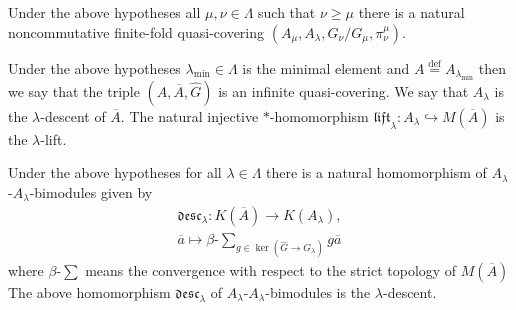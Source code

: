 \documentclass{beamer}
\theoremstyle{plain}
\newcommand{\be}{\begin{equation}}
\newcommand{\ee}{\end{equation}}
\newcommand{\desc}{\mathfrak{desc}}
\newcommand{\lift}{\mathfrak{lift}}
\newcommand{\la}{\lambda}
\newcommand{\La}{\Lambda}
\newcommand{\bt}{\beta}           %
\newcommand{\bydef}{\stackrel{\mathrm{def}}{=}}
\newcommand{\hookto}{\hookrightarrow}        %
\begin{document}
\begin{frame}
 \begin{lemma}\label{infinite_quasi_covering_lem}
	Under the above hypotheses  all $\mu, \nu \in \La$ such that $\nu\ge\mu$ there is a natural noncommutative finite-fold quasi-covering $\left(A_\mu, A_\la, G_\nu/ G_\mu, \pi^\mu_\nu\right)$.
\end{lemma}
\end{frame}
\begin{frame}
 \begin{definition}\label{infinite_quasicovering_defn} 	Under the above hypotheses    $\la_{\mathrm{min}}\in \La$ is the minimal element and $A\bydef A_{\la_{\min}}$ then we say that the triple $\left( A, \overline A, \widehat G\right)$ is an  \alert{infinite quasi-covering}. We say that $A_\la$ is the $\la$-\alert{descent of} $\overline A$. The natural injective $*$-homomorphism $\lift_\la: A_\la \hookto M\left(\overline A \right)$ is the $\la$-\alert{lift}.
\end{definition}
\begin{definition}\label{infinite_desc_defn}
	Under the above  hypotheses   for all $\la\in\La$ there is a  natural   homomorphism of $A_\la$-$A_\la$-bimodules given by
	\be\label{inf_desc_eqn}
	\begin{split}
		\desc_{\la} : K\left(\overline A \right) \to K\left(A_\la \right),\\
		\overline a \mapsto\bt\text{-} \sum_{	g \in \ker\left( \widehat{G}\to G_\la\right) }g \overline a
	\end{split}
	\ee
	where  $\bt\text{-} \sum$ means the convergence with respect to the strict topology of $M\left(\overline A\right)$ 
	The above
	homomorphism   $\desc_{\la}$ of $A_\la$-$A_\la$-bimodules is the $\la$-\alert{descent}.%
\end{definition}

\end{frame}
\end{document}
